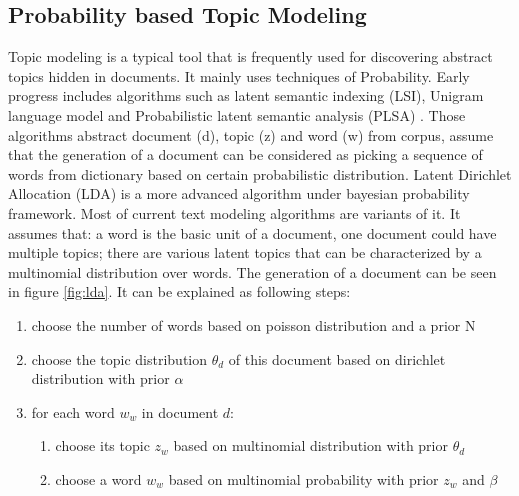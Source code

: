 \subsection{Probability based Topic Modeling}
\label{sec:topic modeling}
Topic modeling is a typical tool that is frequently used for discovering abstract topics hidden in documents. It mainly uses techniques of Probability. Early progress includes algorithms such as latent semantic indexing (LSI), Unigram language model and Probabilistic latent semantic analysis (PLSA) \cite{hofmann1999probabilistic, baeza1999modern}. Those algorithms abstract document (d), topic (z) and word (w) from corpus, assume that the generation of a document can be considered as picking a sequence of words from dictionary based on certain probabilistic distribution. Latent Dirichlet Allocation (LDA) \cite{blei2003latent} is a more advanced algorithm under bayesian probability framework. Most of current text modeling algorithms are variants of it. It assumes that: a word is the basic unit of a document, one document could have multiple topics; there are various latent topics that can be characterized by a multinomial distribution over words. The generation of a document can be seen in figure \ref{fig:lda}. It can be explained as following steps: 
\begin{enumerate}
    \item choose the number of words based on poisson distribution and a prior N
    \item choose the topic distribution {$\theta_d$} of this document based on dirichlet distribution with prior {$\alpha$}
    \item for each word {$w_w$} in document {$d$}:
    \begin{enumerate}
        \item choose its topic {$z_w$} based on multinomial distribution with prior {$\theta_d$}
        \item choose a word {$w_w$} based on multinomial probability with prior {$z_w$} and {$\beta$}
    \end{enumerate}
\end{enumerate}
